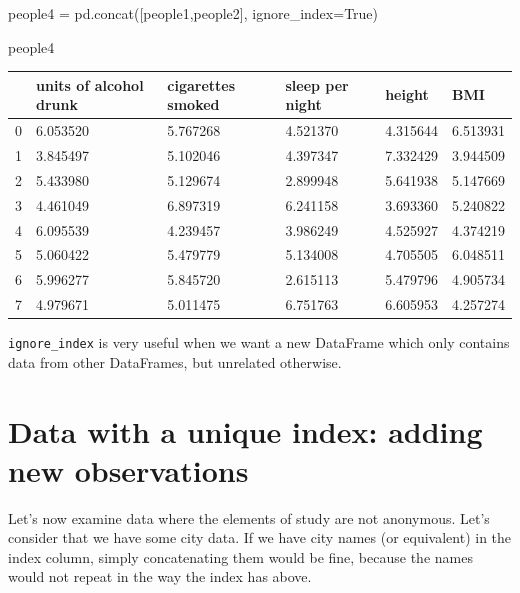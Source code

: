 \documentclass[
  letterpaper,
  DIV=11,
  numbers=noendperiod]{scrreprt}
\newenvironment{Shaded}{\begin{snugshade}}{\end{snugshade}}
\newcommand{\NormalTok}[1]{\textcolor[rgb]{0.00,0.23,0.31}{#1}}
\newcommand{\OperatorTok}[1]{\textcolor[rgb]{0.37,0.37,0.37}{#1}}
\newcommand{\VariableTok}[1]{\textcolor[rgb]{0.07,0.07,0.07}{#1}}
\begin{document}
\begin{Shaded}
\begin{Highlighting}[]
\NormalTok{people4 }\OperatorTok{=}\NormalTok{ pd.concat([people1,people2], ignore\_index}\OperatorTok{=}\VariableTok{True}\NormalTok{)}
\end{Highlighting}
\end{Shaded}

\begin{Shaded}
\begin{Highlighting}[]
\NormalTok{people4}
\end{Highlighting}
\end{Shaded}

\begin{longtable}[]{@{}llllll@{}}
\toprule()
& units of alcohol drunk & cigarettes smoked & sleep per night & height
& BMI \\
\midrule()
\endhead
0 & 6.053520 & 5.767268 & 4.521370 & 4.315644 & 6.513931 \\
1 & 3.845497 & 5.102046 & 4.397347 & 7.332429 & 3.944509 \\
2 & 5.433980 & 5.129674 & 2.899948 & 5.641938 & 5.147669 \\
3 & 4.461049 & 6.897319 & 6.241158 & 3.693360 & 5.240822 \\
4 & 6.095539 & 4.239457 & 3.986249 & 4.525927 & 4.374219 \\
5 & 5.060422 & 5.479779 & 5.134008 & 4.705505 & 6.048511 \\
6 & 5.996277 & 5.845720 & 2.615113 & 5.479796 & 4.905734 \\
7 & 4.979671 & 5.011475 & 6.751763 & 6.605953 & 4.257274 \\
\bottomrule()
\end{longtable}

\texttt{ignore\_index} is very useful when we want a new DataFrame which
only contains data from other DataFrames, but unrelated otherwise.

\hypertarget{data-with-a-unique-index-adding-new-observations}{%
\section{Data with a unique index: adding new
observations}\label{data-with-a-unique-index-adding-new-observations}}

Let's now examine data where the elements of study are not anonymous.
Let's consider that we have some city data. If we have city names (or
equivalent) in the index column, simply concatenating them would be
fine, because the names would not repeat in the way the index has above.
\end{document}
